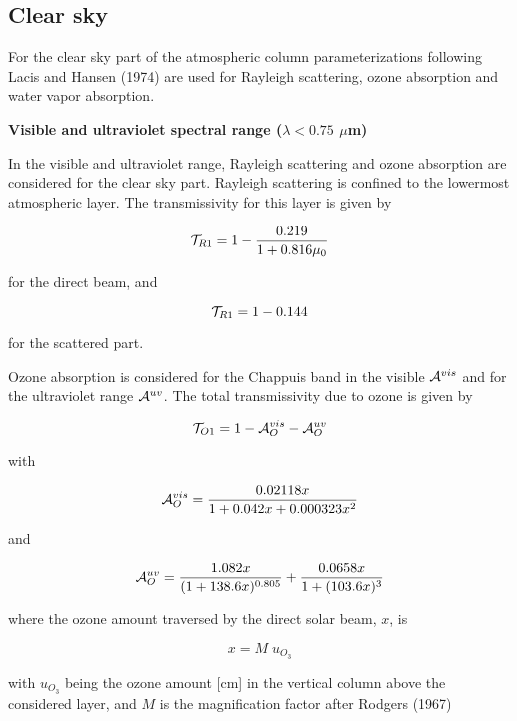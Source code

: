 \subsection*{Clear sky}

For the clear sky part of the atmospheric column 
parameterizations following Lacis and Hansen
(1974) are used for Rayleigh scattering, ozone
absorption and water vapor absorption.

{\bf Visible and ultraviolet spectral range ($\lambda <
0.75$ 
$\mu$m)} 

In the visible and ultraviolet  range, Rayleigh
scattering and ozone absorption are considered for
the clear sky part. Rayleigh scattering is confined to
the lowermost atmospheric layer. The
transmissivity for this layer is given by

\begin{equation}
{\cal T}_{R1}=1 - \frac{0.219}{1+0.816\mu_0}
\end{equation}

for the direct beam, and

\begin{equation}
{\cal T}_{R1}=1 - 0.144
\end{equation}

for the scattered part.

Ozone absorption is considered for the Chappuis band
in the visible ${\cal A}^{vis}$ and for the
ultraviolet range ${\cal A}^{uv}$. The total transmissivity
due to ozone is given by 

\begin{equation}
{\cal T}_{O1} = 1 - {\cal A}^{vis}_O - {\cal A}^{uv}_O
\end{equation}

with 

\begin{equation}
{\cal A}^{vis}_O = \frac{
0.02118x}{1+0.042x+0.000323x^2}
\end{equation}

and

\begin{equation}
{\cal A}^{uv}_O=\frac{1.082x}{(1+138.6x)^{0.805}}+\frac{
0.0658x}{1+(103.6x)^3}
\end{equation}

where the ozone amount traversed by the direct solar
beam, $x$, is

\begin{equation}
x=M \; u_{O_3}
\end{equation}

with $u_{O_3}$ being the ozone amount [cm] in the
vertical column above the considered
layer, and $M$ is the magnification factor after
Rodgers (1967)

